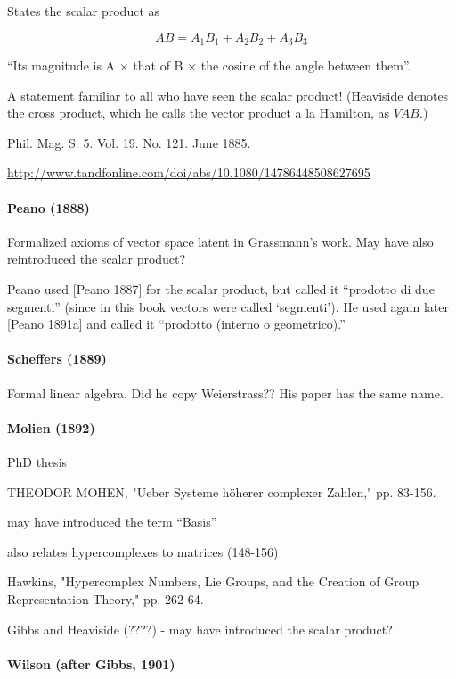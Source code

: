 States the scalar product as

\[
A B = A_1 B_1 + A_2 B_2 + A_3 B_3
\]

``Its magnitude is A $\times$ that of B $\times$ the cosine of the angle between them''.

A statement familiar to all who have seen the scalar product! (Heaviside denotes the cross product, which he calls the vector product a la Hamilton, as $VAB$.)

Phil. Mag. S. 5. Vol. 19. No. 121. June 1885. 

\url{http://www.tandfonline.com/doi/abs/10.1080/14786448508627695}



\paragraph{Peano (1888)~\cite{Peano1888}}

Formalized axioms of vector space latent in Grassmann's work.
May have also reintroduced the scalar product?

Peano used [Peano 1887]
for the scalar product, but called it “prodotto di due segmenti” (since in this book vectors
were called ‘segmenti’). He used
again later [Peano 1891a] and called it “prodotto
(interno o geometrico).”

\paragraph{Scheffers (1889)~\cite{Scheffers1889}}

Formal linear algebra. Did he copy Weierstrass?? His paper has the same name.


\paragraph{Molien (1892)}

PhD thesis

THEODOR MOHEN, "Ueber Systeme höherer complexer Zahlen," pp. 83-156.

may have introduced the term ``Basis''

also relates hypercomplexes to matrices (148-156)

Hawkins, "Hypercomplex Numbers, Lie Groups, and the
Creation of Group Representation Theory," pp. 262-64.

Gibbs and Heaviside (????) - may have introduced the scalar product?

\paragraph{Wilson (after Gibbs, 1901)}

